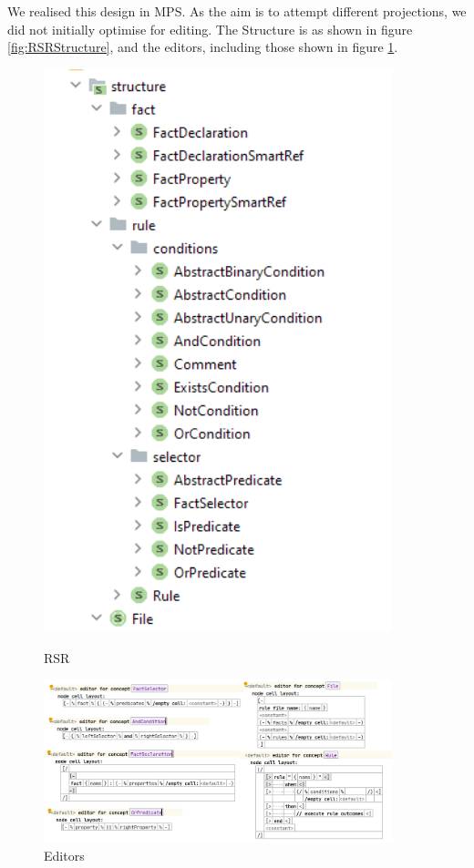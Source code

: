We realised this design in MPS.
As the aim is to attempt different projections, we did not initially optimise for editing.
The Structure is as shown in figure \ref{fig:RSRStructure}, and the editors, including those shown in figure \ref{fig:RSREditors}.

\begin{figure}
    \centering
    \begin{minipage}{0.30\textwidth}
        \centering
        \includegraphics[width=0.9\textwidth]{Sections/images/RSRStructrure.png}
        \caption{RSR}
        \label{fig:RSRStructure}
    \end{minipage}\hfill
    \begin{minipage}{0.70\textwidth}
        \centering
        \includegraphics[width=0.9\textwidth]{Sections/images/RSREditors.png} 
        \caption{Editors}
        \label{fig:RSREditors}
    \end{minipage}
\end{figure}

